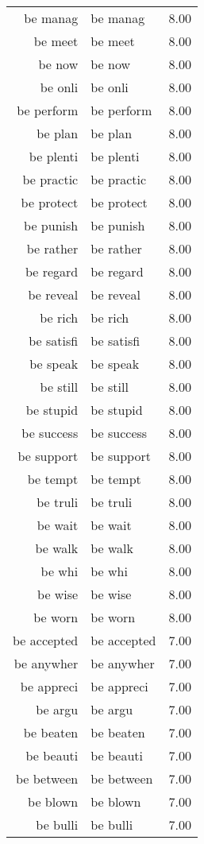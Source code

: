 \begin{table}[ht]
\begin{tabular}{rlr}
  be manag & be manag & 8.00 \\ 
  be meet & be meet & 8.00 \\ 
  be now & be now & 8.00 \\ 
  be onli & be onli & 8.00 \\ 
  be perform & be perform & 8.00 \\ 
  be plan & be plan & 8.00 \\ 
  be plenti & be plenti & 8.00 \\ 
  be practic & be practic & 8.00 \\ 
  be protect & be protect & 8.00 \\ 
  be punish & be punish & 8.00 \\ 
  be rather & be rather & 8.00 \\ 
  be regard & be regard & 8.00 \\ 
  be reveal & be reveal & 8.00 \\ 
  be rich & be rich & 8.00 \\ 
  be satisfi & be satisfi & 8.00 \\ 
  be speak & be speak & 8.00 \\ 
  be still & be still & 8.00 \\ 
  be stupid & be stupid & 8.00 \\ 
  be success & be success & 8.00 \\ 
  be support & be support & 8.00 \\ 
  be tempt & be tempt & 8.00 \\ 
  be truli & be truli & 8.00 \\ 
  be wait & be wait & 8.00 \\ 
  be walk & be walk & 8.00 \\ 
  be whi & be whi & 8.00 \\ 
  be wise & be wise & 8.00 \\ 
  be worn & be worn & 8.00 \\ 
  be accepted & be accepted & 7.00 \\ 
  be anywher & be anywher & 7.00 \\ 
  be appreci & be appreci & 7.00 \\ 
  be argu & be argu & 7.00 \\ 
  be beaten & be beaten & 7.00 \\ 
  be beauti & be beauti & 7.00 \\ 
  be between & be between & 7.00 \\ 
  be blown & be blown & 7.00 \\ 
  be bulli & be bulli & 7.00 \\ 

\end{tabular}
\end{table}
